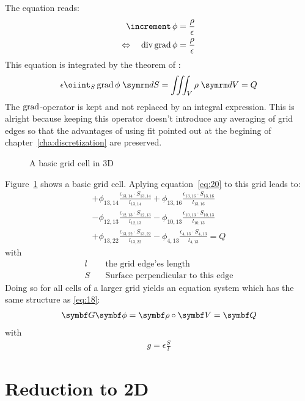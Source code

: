 The  equation reads:
\begin{align}
  \laplaceop \phi &= \frac{\rho}{\epsilon} \\
  \Leftrightarrow\quad\divop \grad \phi &= \frac{\rho}{\epsilon}
\end{align}
This equation is integrated by the theorem of :
\begin{gather}
  \epsilon\oiinteg{S}{\grad \phi}{S} = \iiinteg{V}{\rho}{V} = Q
  \label{eq:20}
\end{gather}
The $\operatorname{grad}$-operator is kept and not replaced by an integral
expression.  This is alright because keeping this operator doesn't
introduce any averaging of grid edges so that the advantages of using
\gls{fit} pointed out at the begining of
chapter~\ref{cha:discretization} are preserved.
\begin{figure}
  \centering
%  
  \caption{A basic grid cell in 3D}
  \label{fig:BasicGridCellPoisson3D}
\end{figure}
Figure~\ref{fig:BasicGridCellPoisson3D} shows a basic grid cell.
Aplying equation~\eqref{eq:20} to this grid leads to:
\newcommand*{\phiepsilonSl}[2]{
  \ensuremath{\phi_{#1,#2}
  \frac{\epsilon_{#1,#2}\cdot S_{#1,#2}}{l_{#1,#2}}}}
\begin{multline}
  +\phiepsilonSl{13}{14}+\phiepsilonSl{13}{16} \\
  -\phiepsilonSl{12}{13}-\phiepsilonSl{10}{13} \\
  +\phiepsilonSl{13}{22}-\phiepsilonSl{4}{13} = Q
\end{multline}
with
\begin{align*}
  l&\quad \text{the grid edge'es length} \\
  S&\quad \text{Surface perpendicular to this edge}
\end{align*}
Doing so for all cells of a larger grid yields an equation system
which has the same structure as \eqref{eq:18}:
\begin{gather}
  \matr{G}\vect{\phi}=\vect{\rho}\circ\vect{V}=\vect{Q}
\end{gather}
with
\begin{gather}
  \label{eq:32}
  g=\epsilon\frac{S}{l}
\end{gather}

\section{Reduction to 2D}
\label{sec:reduction-2d}

